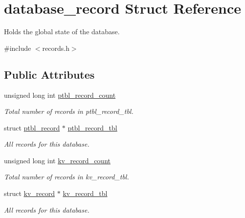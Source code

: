 \hypertarget{structdatabase__record}{}\section{database\+\_\+record Struct Reference}
\label{structdatabase__record}


Holds the global state of the database.  




{\ttfamily \#include $<$records.\+h$>$}

\subsection*{Public Attributes}
\begin{DoxyCompactItemize}
\item 
\mbox{\label{structdatabase__record_a41df64d44b242408348afe7336d83cf3}} 
unsigned long int \mbox{\hyperlink{structdatabase__record_a41df64d44b242408348afe7336d83cf3}{ptbl\+\_\+record\+\_\+count}}
\begin{DoxyCompactList}\small\item\em Total number of records in {\itshape ptbl\+\_\+record\+\_\+tbl}. \end{DoxyCompactList}\item 
\mbox{\label{structdatabase__record_a3540e935aa7806458a5d2b9d8a145234}} 
struct \mbox{\hyperlink{structptbl__record}{ptbl\+\_\+record}} $\ast$ \mbox{\hyperlink{structdatabase__record_a3540e935aa7806458a5d2b9d8a145234}{ptbl\+\_\+record\+\_\+tbl}}
\begin{DoxyCompactList}\small\item\em All records for this database. \end{DoxyCompactList}\item 
\mbox{\label{structdatabase__record_a42fa496922af8e7104c46094fd1820f8}} 
unsigned long int \mbox{\hyperlink{structdatabase__record_a42fa496922af8e7104c46094fd1820f8}{kv\+\_\+record\+\_\+count}}
\begin{DoxyCompactList}\small\item\em Total number of records in {\itshape kv\+\_\+record\+\_\+tbl}. \end{DoxyCompactList}\item 
\mbox{\label{structdatabase__record_a9ba415b161d5661701689f00745d9f19}} 
struct \mbox{\hyperlink{structkv__record}{kv\+\_\+record}} $\ast$ \mbox{\hyperlink{structdatabase__record_a9ba415b161d5661701689f00745d9f19}{kv\+\_\+record\+\_\+tbl}}
\begin{DoxyCompactList}\small\item\em All records for this database. \end{DoxyCompactList}\end{DoxyCompactItemize}


